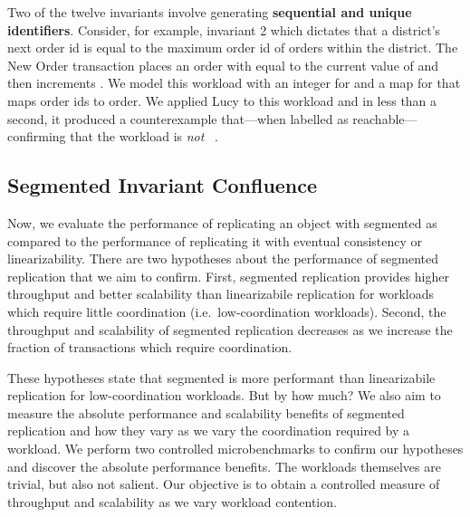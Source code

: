     Two of the twelve invariants involve generating \textbf{sequential and
    unique identifiers}. Consider, for example, invariant 2 which dictates that
    a district's next order id  is equal to the maximum
    order id  of orders within the district. The New Order
    transaction places an order with  equal to the current value of
     and then increments .
    We model this workload with an integer for  and a map
    for  that maps order ids to order.
    We applied Lucy to this workload and in less than a second, it produced a
    counterexample that---when labelled as reachable---confirming that the
    workload is \emph{not} \invariantconfluent{}~\cite{bailis2014coordination}.

\subsection{Segmented Invariant Confluence}%
Now, we evaluate the performance of replicating an object with segmented
\invariantconfluence{} as compared to the performance of replicating it with
eventual consistency or linearizability.
%
There are two hypotheses about the performance of segmented
\invariantconfluent{} replication that we aim to confirm.
%
First, segmented \invariantconfluent{} replication provides higher throughput
and better scalability than linearizabile replication for workloads which
require little coordination (i.e.\ low-coordination workloads).
%
Second, the throughput and scalability of segmented \invariantconfluent{}
replication decreases as we increase the fraction of transactions which require
coordination.

These hypotheses state that segmented \invariantconfluent{} is more performant
than linearizabile replication for low-coordination workloads. But by how much?
We also aim to measure the absolute performance and scalability benefits of
segmented \invariantconfluent{} replication and how they vary as we vary the
coordination required by a workload. We perform two controlled microbenchmarks
to confirm our hypotheses and discover the absolute performance benefits. The
workloads themselves are trivial, but also not salient. Our objective is to
obtain a controlled measure of throughput and scalability as we vary workload
contention.

